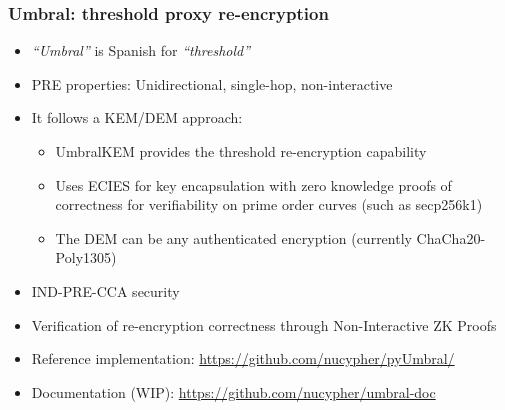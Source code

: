 \documentclass[xetex,mathsans,sans,aspectratio=169]{beamer}
\begin{document}
    \begin{frame}
        \frametitle{Umbral: threshold proxy re-encryption}
        \begin{itemize}
        	\item \emph{``Umbral''} is Spanish for \emph{``threshold''}
            \item PRE properties: Unidirectional, single-hop, non-interactive
            \item It follows a KEM/DEM approach:
            	\begin{itemize}
					\item UmbralKEM provides the threshold re-encryption capability
                    \item Uses ECIES for key encapsulation with zero knowledge proofs of correctness for verifiability on prime order curves (such as secp256k1)
            		\item The DEM can be any authenticated encryption (currently ChaCha20-Poly1305)
        		\end{itemize}
			\item IND-PRE-CCA security
			\item Verification of re-encryption correctness through Non-Interactive ZK Proofs
			\item Reference implementation: \url{https://github.com/nucypher/pyUmbral/}
			\item Documentation (WIP): \url{https://github.com/nucypher/umbral-doc}
        \end{itemize}
    \end{frame}

\end{document}
